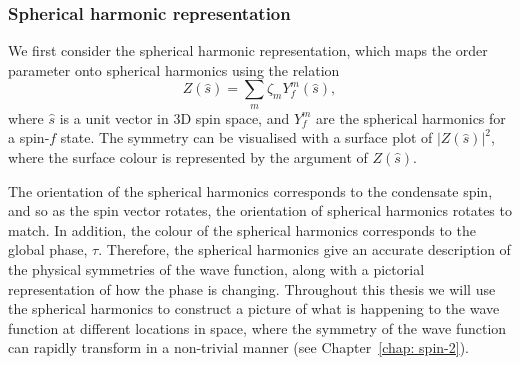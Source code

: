 \subsubsection{Spherical harmonic representation}
We first consider the spherical harmonic representation, which maps the
order parameter onto spherical harmonics using the relation
\begin{equation}
    Z(\hat{s}) = \sum_m\zeta_m Y_f^m(\hat{s}),
    \label{eq: spherical-harmonics}
\end{equation}
where \(\hat{s}\) is a unit vector in 3D spin space, and \(Y_f^m \) are the
spherical harmonics for a spin-\(f\) state.
The symmetry can be visualised with a surface plot of \(|Z(\hat{s})|^2\),
where the surface colour is represented by the argument of \(Z(\hat{s})\).

The orientation of the spherical harmonics corresponds to the condensate spin,
and so as the spin vector rotates, the orientation of spherical harmonics
rotates to match.
In addition, the colour of the spherical harmonics corresponds to the global
phase, \( \tau \).
Therefore, the spherical harmonics give an accurate description of the
physical symmetries of the wave function, along with a pictorial representation
of how the phase is changing.
Throughout this thesis we will use the spherical harmonics to construct a
picture of what is happening to the wave function at different locations in
space, where the symmetry of the wave function can rapidly transform in a
non-trivial manner (see Chapter~\ref{chap: spin-2}).

